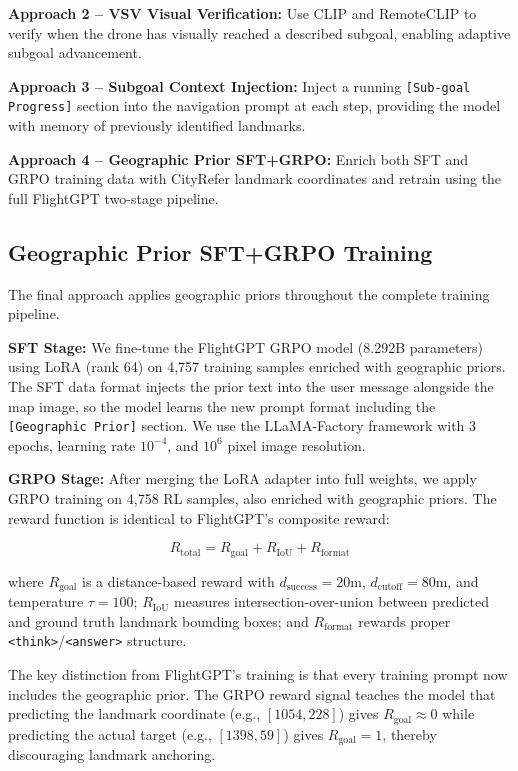 \documentclass[conference]{IEEEtran}
\begin{document}
\textbf{Approach 2 -- VSV Visual Verification:} Use CLIP \cite{clip} and RemoteCLIP \cite{remoteclip} to verify when the drone has visually reached a described subgoal, enabling adaptive subgoal advancement.

\textbf{Approach 3 -- Subgoal Context Injection:} Inject a running \texttt{[Sub-goal Progress]} section into the navigation prompt at each step, providing the model with memory of previously identified landmarks.

\textbf{Approach 4 -- Geographic Prior SFT+GRPO:} Enrich both SFT and GRPO training data with CityRefer landmark coordinates and retrain using the full FlightGPT two-stage pipeline.

\subsection{Geographic Prior SFT+GRPO Training}

The final approach applies geographic priors throughout the complete training pipeline.

\textbf{SFT Stage:} We fine-tune the FlightGPT GRPO model (8.292B parameters) using LoRA (rank 64) on 4,757 training samples enriched with geographic priors. The SFT data format injects the prior text into the user message alongside the map image, so the model learns the new prompt format including the \texttt{[Geographic Prior]} section. We use the LLaMA-Factory \cite{llamafactory} framework with 3 epochs, learning rate $10^{-4}$, and $10^6$ pixel image resolution.

\textbf{GRPO Stage:} After merging the LoRA adapter into full weights, we apply GRPO training on 4,758 RL samples, also enriched with geographic priors. The reward function is identical to FlightGPT's composite reward:

\begin{equation}
R_{\text{total}} = R_{\text{goal}} + R_{\text{IoU}} + R_{\text{format}}
\label{eq:reward}
\end{equation}

where $R_{\text{goal}}$ is a distance-based reward with $d_{\text{success}} = 20$m, $d_{\text{cutoff}} = 80$m, and temperature $\tau = 100$; $R_{\text{IoU}}$ measures intersection-over-union between predicted and ground truth landmark bounding boxes; and $R_{\text{format}}$ rewards proper \texttt{<think>}/\texttt{<answer>} structure.

The key distinction from FlightGPT's training is that every training prompt now includes the geographic prior. The GRPO reward signal teaches the model that predicting the landmark coordinate (e.g., $[1054, 228]$) gives $R_{\text{goal}} \approx 0$ while predicting the actual target (e.g., $[1398, 59]$) gives $R_{\text{goal}} = 1$, thereby discouraging landmark anchoring.
\end{document}
